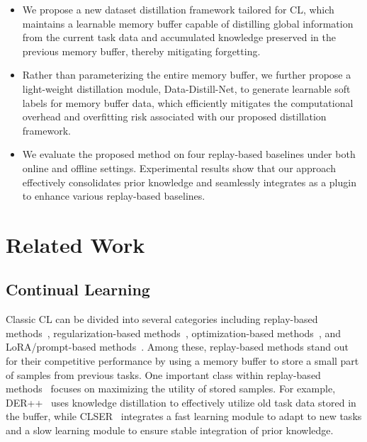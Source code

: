 \documentclass[table, xcdraw]{article}
\theoremstyle{plain}
\theoremstyle{definition}
\theoremstyle{remark}
\begin{document}
\begin{itemize}[leftmargin=4mm, itemsep=-2mm, topsep=-2 mm]
    \item We propose a new dataset distillation framework tailored for CL, which maintains a learnable memory buffer capable of distilling global information from the current task data and accumulated knowledge preserved in the previous memory buffer, thereby mitigating forgetting.
    \item Rather than parameterizing the entire memory buffer, we further propose a light-weight distillation module, Data-Distill-Net, to generate learnable soft labels for memory buffer data, which efficiently mitigates the computational overhead and overfitting risk associated with our proposed distillation framework.
    \item We evaluate the proposed method on four replay-based baselines under both online and offline settings. Experimental results show that our approach effectively consolidates prior knowledge and seamlessly integrates as a plugin to enhance various replay-based baselines.
\end{itemize}


\section{Related Work}
\subsection{Continual Learning}
Classic CL can be divided into several categories including replay-based methods~\cite{ratcliff1990connectionist,derpp,clser,wu2024meta,wang2024dual}, regularization-based methods~\cite{LwF, EWC}, optimization-based methods~\cite{GEM,AGEM,MER,wu2024mitigating}, and LoRA/prompt-based methods~\cite{wu2025sd-lora,zhiqi2025advancing,piao2024federated,yang2024continual,wang2025singular}. Among these, replay-based methods stand out for their competitive performance by using a memory buffer to store a small part of samples from previous tasks.
One important class within replay-based methods~\cite{derpp,clser} focuses on maximizing the utility of stored samples. For example, DER++~\cite{derpp} uses knowledge distillation to effectively utilize old task data stored in the buffer, while CLSER~\cite{clser} integrates a fast learning module to adapt to new tasks and a slow learning module to ensure stable integration of prior knowledge. 
\end{document}
